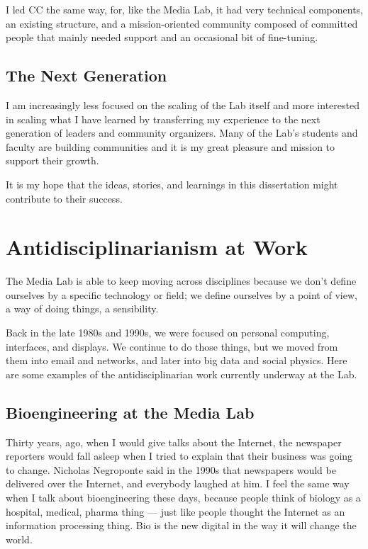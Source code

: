 I led \ac{CC} the same way, for, like the Media Lab, it had very technical components, an existing structure, and a mission-oriented community composed of committed people that mainly needed support and an occasional bit of fine-tuning.

\subsection{The Next Generation}

I am increasingly less focused on the scaling of the Lab itself and more interested in scaling what I have learned by transferring my experience to the next generation of leaders and community organizers. Many of the Lab's students and faculty are building communities and it is my great pleasure and mission to support their growth.

It is my hope that the ideas, stories, and learnings in this dissertation might contribute to their success.

\section{Antidisciplinarianism at Work}

The Media Lab is able to keep moving across disciplines because we don't define ourselves by a specific technology or field; we define ourselves by a point of view, a way of doing things, a sensibility. 

Back in the late 1980s and 1990s, we were focused on personal computing, interfaces, and displays. We continue to do those things, but we moved from them into email and networks, and later into big data and social physics. Here are some examples of the antidisciplinarian work currently underway at the Lab. 

\subsection{Bioengineering at the Media Lab}

Thirty years, ago, when I would give talks about the Internet, the newspaper reporters would fall asleep when I tried to explain that their business was going to change. Nicholas Negroponte said in the 1990s that newspapers would be delivered over the Internet, and everybody laughed at him. I feel the same way when I talk about bioengineering these days, because people think of biology as a hospital, medical, pharma thing --- just like people thought the Internet as an information processing thing. Bio is the new digital in the way it will change the world.

